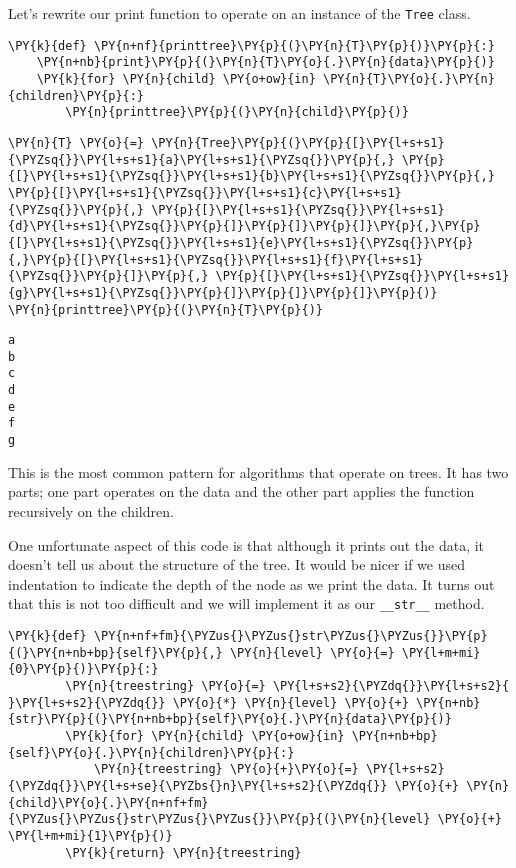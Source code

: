 Let's rewrite our print function to operate on an instance of the \texttt{Tree} class.

\begin{Verbatim}[commandchars=\\\{\}]
\PY{k}{def} \PY{n+nf}{printtree}\PY{p}{(}\PY{n}{T}\PY{p}{)}\PY{p}{:}
    \PY{n+nb}{print}\PY{p}{(}\PY{n}{T}\PY{o}{.}\PY{n}{data}\PY{p}{)}
    \PY{k}{for} \PY{n}{child} \PY{o+ow}{in} \PY{n}{T}\PY{o}{.}\PY{n}{children}\PY{p}{:}
        \PY{n}{printtree}\PY{p}{(}\PY{n}{child}\PY{p}{)}
\end{Verbatim}



\begin{Verbatim}[commandchars=\\\{\}]
\PY{n}{T} \PY{o}{=} \PY{n}{Tree}\PY{p}{(}\PY{p}{[}\PY{l+s+s1}{\PYZsq{}}\PY{l+s+s1}{a}\PY{l+s+s1}{\PYZsq{}}\PY{p}{,} \PY{p}{[}\PY{l+s+s1}{\PYZsq{}}\PY{l+s+s1}{b}\PY{l+s+s1}{\PYZsq{}}\PY{p}{,} \PY{p}{[}\PY{l+s+s1}{\PYZsq{}}\PY{l+s+s1}{c}\PY{l+s+s1}{\PYZsq{}}\PY{p}{,} \PY{p}{[}\PY{l+s+s1}{\PYZsq{}}\PY{l+s+s1}{d}\PY{l+s+s1}{\PYZsq{}}\PY{p}{]}\PY{p}{]}\PY{p}{]}\PY{p}{,}\PY{p}{[}\PY{l+s+s1}{\PYZsq{}}\PY{l+s+s1}{e}\PY{l+s+s1}{\PYZsq{}}\PY{p}{,}\PY{p}{[}\PY{l+s+s1}{\PYZsq{}}\PY{l+s+s1}{f}\PY{l+s+s1}{\PYZsq{}}\PY{p}{]}\PY{p}{,} \PY{p}{[}\PY{l+s+s1}{\PYZsq{}}\PY{l+s+s1}{g}\PY{l+s+s1}{\PYZsq{}}\PY{p}{]}\PY{p}{]}\PY{p}{]}\PY{p}{)}
\PY{n}{printtree}\PY{p}{(}\PY{n}{T}\PY{p}{)}
\end{Verbatim}

\begin{Verbatim}
a
b
c
d
e
f
g

\end{Verbatim}


This is the most common pattern for algorithms that operate on trees.
It has two parts; one part operates on the data and the other part applies the function recursively on the children.


One unfortunate aspect of this code is that although it prints out the data, it doesn't tell us about the structure of the tree.
It would be nicer if we used indentation to indicate the depth of the node as we print the data.
It turns out that this is not too difficult and we will implement it as our \texttt{\_\_str\_\_} method.

\begin{Verbatim}[commandchars=\\\{\}]
    \PY{k}{def} \PY{n+nf+fm}{\PYZus{}\PYZus{}str\PYZus{}\PYZus{}}\PY{p}{(}\PY{n+nb+bp}{self}\PY{p}{,} \PY{n}{level} \PY{o}{=} \PY{l+m+mi}{0}\PY{p}{)}\PY{p}{:}
        \PY{n}{treestring} \PY{o}{=} \PY{l+s+s2}{\PYZdq{}}\PY{l+s+s2}{  }\PY{l+s+s2}{\PYZdq{}} \PY{o}{*} \PY{n}{level} \PY{o}{+} \PY{n+nb}{str}\PY{p}{(}\PY{n+nb+bp}{self}\PY{o}{.}\PY{n}{data}\PY{p}{)}
        \PY{k}{for} \PY{n}{child} \PY{o+ow}{in} \PY{n+nb+bp}{self}\PY{o}{.}\PY{n}{children}\PY{p}{:}
            \PY{n}{treestring} \PY{o}{+}\PY{o}{=} \PY{l+s+s2}{\PYZdq{}}\PY{l+s+se}{\PYZbs{}n}\PY{l+s+s2}{\PYZdq{}} \PY{o}{+} \PY{n}{child}\PY{o}{.}\PY{n+nf+fm}{\PYZus{}\PYZus{}str\PYZus{}\PYZus{}}\PY{p}{(}\PY{n}{level} \PY{o}{+} \PY{l+m+mi}{1}\PY{p}{)}
        \PY{k}{return} \PY{n}{treestring}
\end{Verbatim}



